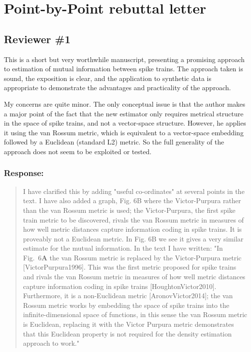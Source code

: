 \documentclass[12pt]{article}
\begin{document}
\section*{Point-by-Point rebuttal letter}

\subsection*{Reviewer \#1}

This is a short but very worthwhile manuscript, presenting a promising
approach to estimation of mutual information between spike trains.
The approach taken is sound, the exposition is clear, and the
application to synthetic data is appropriate to demonstrate the
advantages and practicality of the approach.

My concerns are quite minor.  The only conceptual issue is that the
author makes a major point of the fact that the new estimator only
requires metrical structure in the space of spike trains, and not a
vector-space structure.  However, he applies it using the van Rossum
metric, which is equivalent to a vector-space embedding followed by a
Euclidean (standard L2) metric.  So the full generality of the
approach does not seem to be exploited or tested.

\subsubsection*{Response:}
\begin{quote}
 I have clarified this by adding "useful co-ordinates" at several
   points in the text. I have also added a graph, Fig. 6B where the
   Victor-Purpura rather than the van Rossum metric is used; the
   Victor-Purpura, the first spike train metric to be discovered,
   rivals the van Rossum metric in measures of how well metric
   distances capture information coding in spike trains. It is proveably
   not a Euclidean metric. In Fig. 6B we see it gives a very similar
   estimate for the mutual information. In the text I have written:
   "In Fig.~6\textbf{A} the van Rossum metric is replaced
   by the Victor-Purpura metric [VictorPurpura1996]. This was the
   first metric proposed for spike trains and rivals the van Rossum
   metric in measures of how well metric distances capture information
   coding in spike trains [HoughtonVictor2010]. Furthermore, it
   is a non-Euclidean metric [AronovVictor2014]; the van Rossum
   metric works by embedding the space of spike trains into the
   infinite-dimensional space of functions, in this sense the van
   Rossum metric is Euclidean, replacing it with the Victor Purpura
   metric demonstrates that this Euclidean property is not required
   for the density estimation approach to work."
\end{quote}
\end{document}

